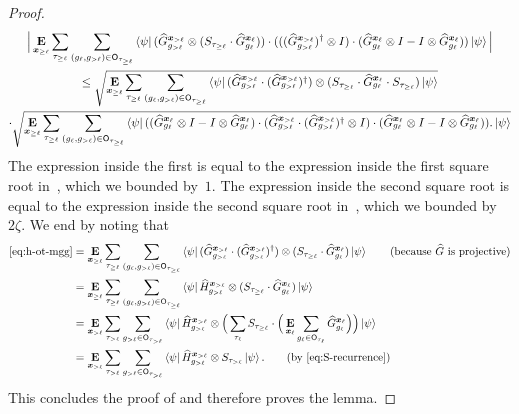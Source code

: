 \begin{proof}
\begin{multline*}
  \Big|\mathop{\bf E\/}_{{\boldsymbol{x}}_{\geq \ell}} \sum_{\tau_{\geq \ell}}
   \sum_{(g_{\ell}, g_{>\ell}) \in \mathsf{O}_{\tau_{\geq \ell}}}
   	\bra{\psi} (\widehat{G}^{{\boldsymbol{x}}_{> \ell}}_{g_{> \ell}}
		\otimes (S_{\tau_{\geq \ell}}
		\cdot \widehat{G}^{{\boldsymbol{x}}_{\ell}}_{g_{\ell}}))
		\cdot
		(((\widehat{G}^{{\boldsymbol{x}}_{> \ell}}_{g_{> \ell}})^\dagger \otimes I)
		\cdot (\widehat{G}^{{\boldsymbol{x}}_{\ell}}_{g_{\ell}} \otimes I - I \otimes \widehat{G}^{{\boldsymbol{x}}_{\ell}}_{g_{\ell}}))\ket{\psi}
  \Big|  \\
  \leq \sqrt{\mathop{\bf E\/}_{{\boldsymbol{x}}_{\geq \ell}}\sum_{\tau_{\geq \ell}}
   \sum_{(g_{\ell}, g_{>\ell}) \in \mathsf{O}_{\tau_{\geq \ell}}}
   	\bra{\psi} (\widehat{G}^{{\boldsymbol{x}}_{> \ell}}_{g_{> \ell}} \cdot (\widehat{G}^{{\boldsymbol{x}}_{> \ell}}_{g_{> \ell}})^\dagger)
		\otimes (S_{\tau_{\geq \ell}}
		\cdot \widehat{G}^{{\boldsymbol{x}}_{\ell}}_{g_{\ell}} \cdot S_{\tau_{\geq \ell}}) \ket{\psi}} \nonumber \\
  \cdot \sqrt{\mathop{\bf E\/}_{{\boldsymbol{x}}_{\geq \ell}} \sum_{\tau_{\geq \ell}}
   \sum_{(g_{\ell}, g_{>\ell}) \in \mathsf{O}_{\tau_{\geq \ell}}} \bra{\psi}
   ( (\widehat{G}^{{\boldsymbol{x}}_\ell}_{g_\ell} \otimes I - I \otimes \widehat{G}^{{\boldsymbol{x}}_\ell}_{g_\ell})\cdot
   (\widehat{G}^{{\boldsymbol{x}}_{> \ell}}_{g_{> \ell}} \cdot (\widehat{G}^{{\boldsymbol{x}}_{> \ell}}_{g_{> \ell}})^\dagger \otimes I)
    \cdot (\widehat{G}^{{\boldsymbol{x}}_\ell}_{g_\ell} \otimes I - I \otimes \widehat{G}^{{\boldsymbol{x}}_\ell}_{g_\ell})).
    \ket{\psi}}
\end{multline*}
The expression inside the first is equal to the expression inside the first square root in~,
which we bounded by~$1$.
The expression inside the second square root is equal to the expression inside the second square root in~,
which we bounded by~$2\zeta$.
We end by noting that
\begin{align*}
\eqref{eq:h-ot-mgg}
& =
\E_{\bx_{\geq \ell}} \sum_{\tau_{\geq \ell}}  \sum_{(g_{\ell}, g_{>\ell}) \in \sfO_{\tau_{\geq \ell}}}
	\bra{\psi} (\wG^{\bx_{> \ell}}_{g_{> \ell}} \cdot (\wG^{\bx_{> \ell}}_{g_{> \ell}})^\dagger) \ot (S_{\tau_{\geq \ell}} \cdot \wG^{\bx_{\ell}}_{g_{\ell}})\ket{\psi} \tag{because $\wG$ is projective}\\
& =
\E_{\bx_{\geq \ell}} \sum_{\tau_{\geq \ell}}  \sum_{(g_{\ell}, g_{>\ell}) \in \sfO_{\tau_{\geq \ell}}}
	\bra{\psi} \wH^{\bx_{> \ell}}_{g_{> \ell}} \ot (S_{\tau_{\geq \ell}} \cdot \wG^{\bx_{\ell}}_{g_{\ell}})\ket{\psi}\\
& =\E_{\bx_{> \ell}} \sum_{\tau_{> \ell}}  \sum_{g_{>\ell} \in \sfO_{\tau_{> \ell}}}
	\bra{\psi} \wH^{\bx_{> \ell}}_{g_{> \ell}} \ot \Big(\sum_{\tau_{\ell}}S_{\tau_{\geq \ell}} \cdot
		\Big(\E_{\bx_{\ell}} \sum_{g_\ell \in \sfO_{\tau_{\ell}}}\wG^{\bx_{\ell}}_{g_{\ell}}\Big)\Big)\ket{\psi}\\
& =\E_{\bx_{> \ell}} \sum_{\tau_{> \ell}}  \sum_{g_{>\ell} \in \sfO_{\tau_{> \ell}}}
	\bra{\psi} \wH^{\bx_{> \ell}}_{g_{> \ell}} \ot S_{\tau_{>\ell}}\ket{\psi}. \tag{by \Cref{eq:S-recurrence}}
\end{align*}
This concludes the proof of
and therefore proves the lemma.
\end{proof}



